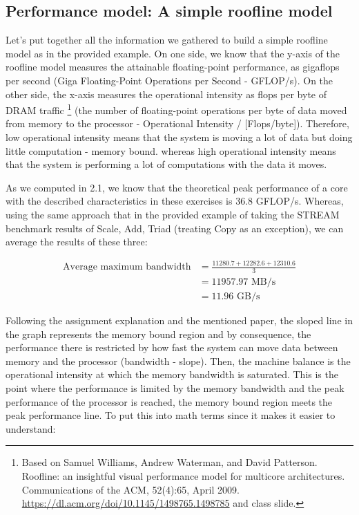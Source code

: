 \documentclass[unicode,11pt,a4paper,oneside,numbers=endperiod,openany]{scrartcl}
\begin{document}
\subsection{Performance model: A simple roofline model}
Let's put together all the information we gathered to build a simple roofline model as in the provided example. 
On one side, we know that the y-axis of the roofline model measures the attainable floating-point performance, as gigaflops per second (Giga Floating-Point Operations per Second - GFLOP/s).
On the other side, the x-axis measures the operational intensity as flops per byte of DRAM traffic \footnote{Based on Samuel Williams, Andrew Waterman, and David Patterson. Roofline: an insightful visual performance model
for multicore architectures. Communications of the ACM, 52(4):65, April 2009. \url{https://dl.acm.org/doi/10.1145/1498765.1498785} and class slide.} (the number of floating-point operations per byte of data moved from memory to the processor - Operational Intensity / [Flops/byte]).
Therefore, low operational intensity means that the system is moving a lot of data but doing little computation - memory bound. whereas high operational intensity means that the system is performing a lot of computations with the data it moves. 

As we computed in 2.1, we know that the theoretical peak performance of a core with the described characteristics in these exercises is 36.8 GFLOP/s. 
Whereas, using the same approach that in the provided example of taking the STREAM benchmark results of Scale, Add, Triad (treating Copy as an exception), we can average the results of these three:

\begin{align*}
    \text{Average maximum bandwidth} &= \frac{11280.7 + 12282.6 + 12310.6}{3} \\
                    &= 11957.97 \text{ MB/s} \\
                    &= 11.96 \text{ GB/s}
\end{align*}

Following the assignment explanation and the mentioned paper, the sloped line in the graph represents the memory bound region and by consequence, the performance there is restricted by how fast the system can move data between memory and the processor (bandwidth - slope).
Then, the machine balance is the operational intensity at which the memory bandwidth is saturated.
This is the point where the performance is limited by the memory bandwidth and the peak performance of the processor is reached, the memory bound region meets the peak performance line.
To put this into math terms since it makes it easier to understand:
\end{document}
